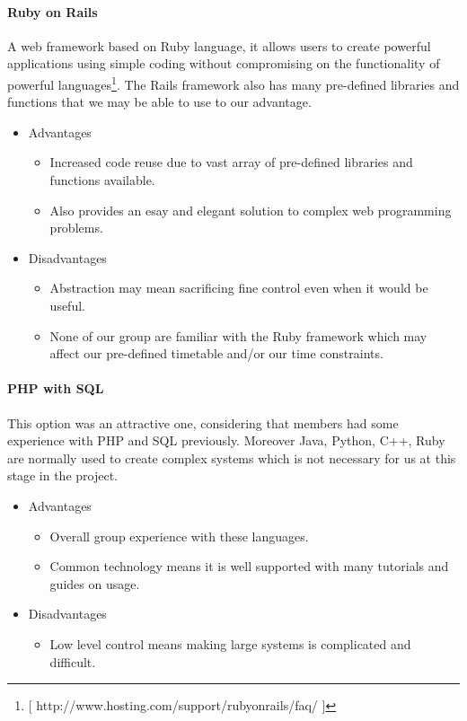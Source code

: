 \paragraph{Ruby on Rails}
A web framework based on Ruby language, it allows users to create powerful applications using simple coding without compromising on the functionality of powerful languages\footnote{[ http://www.hosting.com/support/rubyonrails/faq/ ]}. The Rails framework also has many pre-defined libraries and functions that we may be able to use to our advantage.
\begin{itemize}
\item Advantages
	\begin{itemize}
	\item Increased code reuse due to vast array of pre-defined libraries and functions available.
	\item Also provides an esay and elegant solution to complex web programming problems.
	\end {itemize}
\item Disadvantages
	\begin{itemize}
	\item Abstraction may mean sacrificing fine control even when it would be useful.
	\item None of our group are familiar with the Ruby framework which may affect our pre-defined timetable and/or our time constraints.
	\end {itemize}
\end {itemize}

\paragraph{PHP with SQL}
This option was an attractive one, considering that members had some experience with PHP and SQL previously. Moreover Java, Python, C++, Ruby are normally used to create complex systems which is not necessary for us 
at this stage in the project.
\begin{itemize}
\item Advantages
	\begin{itemize}
	\item Overall group experience with these languages. 
	\item Common technology means it is well supported with many tutorials and guides on usage.
	\end {itemize}
\item Disadvantages
	\begin{itemize}
	\item Low level control means making large systems is complicated and difficult.
	\end {itemize}
\end {itemize}
